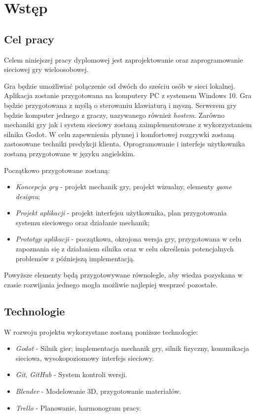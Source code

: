 \chapter*{Wstęp}
\section*{Cel pracy}
Celem niniejszej pracy dyplomowej jest zaprojektowanie oraz zaprogramowanie sieciowej gry wieloosobowej.

Gra będzie umożliwiać połączenie od dwóch do sześciu osób w sieci lokalnej. Aplikacja zostanie przygotowana na komputery PC z systemem Windows 10. Gra będzie przygotowana z myślą o sterowaniu klawiaturą i myszą.
Serwerem gry będzie komputer jednego z graczy, nazywanego również \emph{hostem}.
Zarówno mechaniki gry jak i system sieciowy zostaną zaimplementowane z wykorzystaniem silnika Godot. \cite{godot_main}
W celu zapewnienia płynnej i komfortowej rozgrywki zostaną zastosowane techniki predykcji klienta.
Oprogramowanie i interfejs użytkownika zostaną przygotowane w języku angielskim.

Początkowo przygotowane zostaną:
\begin{itemize}
    \item \emph{Koncepcja gry} - projekt mechanik gry, projekt wizualny, elementy \emph{game designu};
    \item \emph{Projekt aplikacji} - projekt interfejsu użytkownika, plan przygotowania systemu sieciowego oraz działanie mechanik;
    \item \emph{Prototyp aplikacji} - początkowa, okrojona wersja gry, przygotowana w celu zapoznania się z działaniem silnika oraz w celu określenia potencjalnych problemów z późniejszą implementacją. 
\end{itemize}

Powyższe elementy będą przygotowywane równolegle, aby wiedza pozyskana w czasie rozwijania jednego mogła możliwie najlepiej wesprzeć pozostałe.

\section*{Technologie}
W rozwoju projektu wykorzystane zostaną poniższe technologie:
\begin{itemize}
    \item \emph{Godot} - Silnik gier; implementacja mechanik gry, silnik fizyczny, komunikacja sieciowa, wysokopoziomowy interfejs sieciowy.
    \item \emph{Git}, \emph{GitHub} - System kontroli wersji.
    \item \emph{Blender} - Modelowanie 3D, przygotowanie materiałów.
    \item \emph{Trello} - Planowanie, harmonogram pracy.
\end{itemize}

